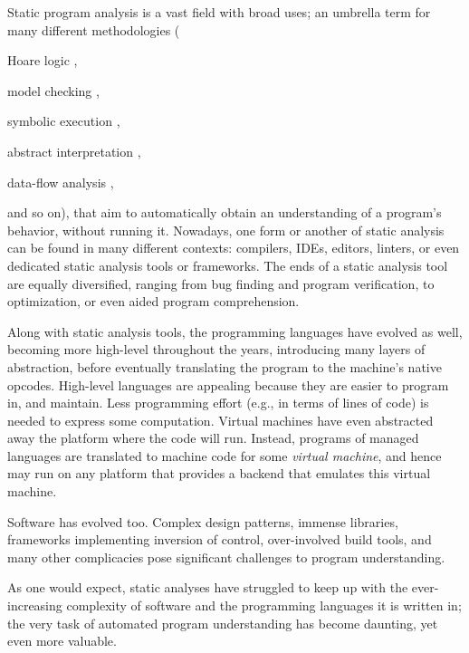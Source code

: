 Static program analysis is a vast field with broad uses; an umbrella
term for many different methodologies (%
\begin{inparablank}
  \item Hoare logic
    \cite{journals/cacm/Hoare69,floyd1967assigning,lics:2002/Reynolds,csl/OHearnRY01},
  \item model checking
    \cite{icalp/EmersonC80,lop/ClarkeE81,toplas/ClarkeES86,programm/QueilleS82},
  \item symbolic execution
    \cite{journals/cacm/King76,journals/tse/Howden77,conf/kbse/PasareanuR10,Boyer:1975:SFS:390016.808445},
  \item abstract interpretation
    \cite{popl/CousotC77,journals/jlp/CousotC92,journals/logcom/CousotC92},
  \item data-flow analysis
    \cite{popl/Kildall73,books/daglib/0030999,books/mk/Muchnick1997,journals/acta/KamU77,popl/RepsHS95,books/ph/SharirP81},
\end{inparablank}
and so on), that aim to automatically obtain an
understanding of a program's behavior, without running it. Nowadays,
one form or another of static analysis can be found in many different
contexts: compilers, IDEs, editors, linters, or even dedicated static
analysis tools or frameworks. The ends of a static analysis tool are
equally diversified, ranging from bug finding and program
verification, to optimization, or even aided program comprehension.

Along with static analysis tools, the programming languages have
evolved as well, becoming more high-level throughout the years,
introducing many layers of abstraction, before eventually translating
the program to the machine's native opcodes. High-level languages are
appealing because they are easier to program in, and maintain. Less
programming effort (e.g., in terms of lines of code) is needed to
express some computation. Virtual machines have even abstracted away
the platform where the code will run. Instead, programs of managed
languages are translated to machine code for some \emph{virtual
  machine}, and hence may run on any platform that provides a backend
that emulates this virtual machine.

Software has evolved too. Complex design patterns, immense libraries,
frameworks implementing inversion of control, over-involved build
tools, and many other complicacies pose significant challenges to
program understanding.

As one would expect, static analyses have struggled to keep up with
the ever-increasing complexity of software and the programming
languages it is written in; the very task of automated program
understanding has become daunting, yet even more valuable.


